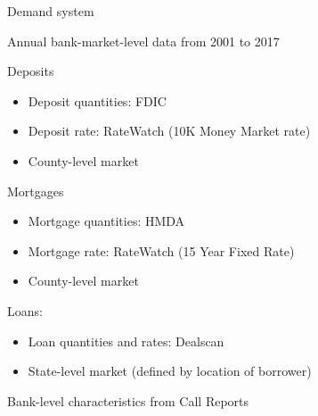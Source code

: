 \documentclass[notes,11pt, aspectratio=169]{beamer}
\newenvironment{wideitemize}{\itemize\addtolength{\itemsep}{10pt}}{\enditemize}
\begin{document}
\begin{frame}{Demand system}
    \vspace{0.2cm}
    \begin{wideitemize}
\item Annual bank-market-level data from 2001 to 2017
\item  Deposits
\begin{itemize}
    \item Deposit quantities: FDIC
    \item Deposit rate: RateWatch (10K Money Market rate)
   \item County-level market
   \end{itemize}
\item  Mortgages
\begin{itemize}
    \item  Mortgage quantities: HMDA
    \item Mortgage rate: RateWatch (15 Year Fixed Rate)
     \item  County-level market
\end{itemize}
\item Loans:
\begin{itemize}
\item Loan quantities and rates: Dealscan
\item State-level market (defined by location of borrower)
\end{itemize}
\item Bank-level characteristics from Call Reports
    \end{wideitemize}
\end{frame}
\end{document}

